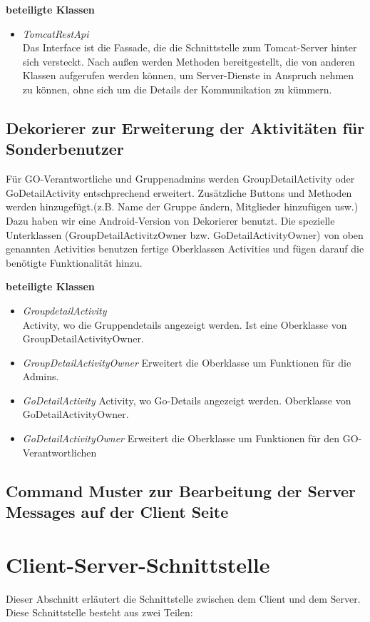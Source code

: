 \documentclass[parskip=full]{scrartcl}
\begin{document}
\textbf{beteiligte Klassen}
\begin{itemize}
	\item \textit{TomcatRestApi} \\
	Das Interface ist die Fassade, die die Schnittstelle zum Tomcat-Server hinter sich versteckt. Nach außen werden Methoden bereitgestellt, die von anderen Klassen aufgerufen werden können, um Server-Dienste in Anspruch nehmen zu können, ohne sich um die Details der Kommunikation zu kümmern.
\end{itemize}

\subsection{Dekorierer zur Erweiterung der Aktivitäten für Sonderbenutzer}
Für GO-Verantwortliche und Gruppenadmins werden GroupDetailActivity oder GoDetailActivity entschprechend erweitert. Zusätzliche Buttons und Methoden werden hinzugefügt.(z.B. Name der Gruppe ändern, Mitglieder hinzufügen usw.) Dazu haben wir eine Android-Version von Dekorierer benutzt. Die spezielle Unterklassen (GroupDetailActivitzOwner bzw. GoDetailActivityOwner) von oben genannten Activities benutzen fertige Oberklassen Activities und fügen darauf die benötigte Funktionalität hinzu.

\textbf{beteiligte Klassen}
\begin{itemize}
\item \textit{GroupdetailActivity} \\
Activity, wo die Gruppendetails angezeigt werden. Ist eine Oberklasse von GroupDetailActivityOwner.
\item \textit{GroupDetailActivityOwner}
Erweitert die Oberklasse um Funktionen für die Admins.
\item \textit{GoDetailActivity}
Activity, wo Go-Details angezeigt werden. Oberklasse von GoDetailActivityOwner.
\item \textit{GoDetailActivityOwner}
Erweitert die Oberklasse um Funktionen für den GO-Verantwortlichen
\end{itemize}


\subsection{Command Muster zur Bearbeitung der Server Messages auf der Client Seite}


\newpage

\section{Client-Server-Schnittstelle}
Dieser Abschnitt erläutert die Schnittstelle zwischen dem Client und dem Server. Diese Schnittstelle besteht aus zwei Teilen:
\end{document}
